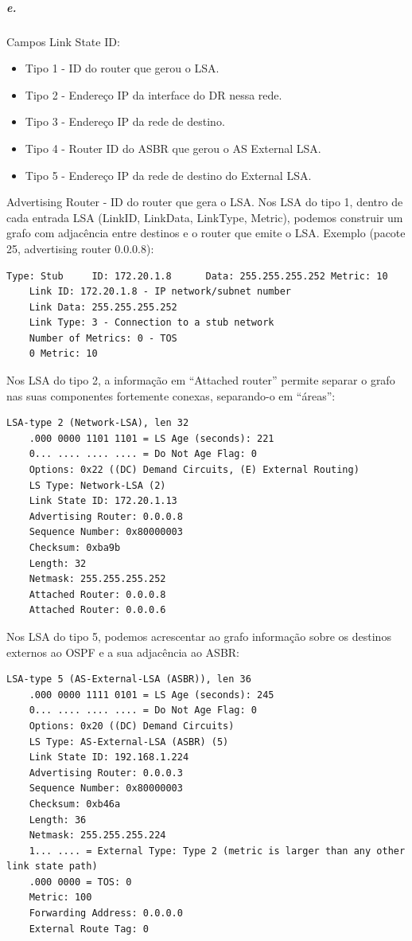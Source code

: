 \subparagraph{e.} Campos Link State ID:
\begin{itemize}
\item Tipo 1 - ID do router que gerou o LSA.
\item Tipo 2 - Endereço IP da interface do DR nessa rede.
\item Tipo 3 - Endereço IP da rede de destino.
\item Tipo 4 - Router ID do ASBR que gerou o AS External LSA.
\item Tipo 5 - Endereço IP da rede de destino do External LSA.
\end{itemize}
Advertising Router - ID do router que gera o LSA.
Nos LSA do tipo 1, dentro de cada entrada LSA (LinkID, LinkData,
LinkType, Metric), podemos construir um grafo com adjacência entre
destinos e o router que emite o LSA. Exemplo (pacote 25, advertising
router 0.0.0.8):
\begin{verbatim}
Type: Stub     ID: 172.20.1.8      Data: 255.255.255.252 Metric: 10
    Link ID: 172.20.1.8 - IP network/subnet number
    Link Data: 255.255.255.252
    Link Type: 3 - Connection to a stub network
    Number of Metrics: 0 - TOS
    0 Metric: 10
\end{verbatim}
Nos LSA do tipo 2, a informação em ``Attached router'' permite separar
o grafo nas suas componentes fortemente conexas, separando-o em
``áreas'':
\begin{verbatim}
LSA-type 2 (Network-LSA), len 32
    .000 0000 1101 1101 = LS Age (seconds): 221
    0... .... .... .... = Do Not Age Flag: 0
    Options: 0x22 ((DC) Demand Circuits, (E) External Routing)
    LS Type: Network-LSA (2)
    Link State ID: 172.20.1.13
    Advertising Router: 0.0.0.8
    Sequence Number: 0x80000003
    Checksum: 0xba9b
    Length: 32
    Netmask: 255.255.255.252
    Attached Router: 0.0.0.8
    Attached Router: 0.0.0.6
\end{verbatim}
Nos LSA do tipo 5, podemos acrescentar ao grafo informação sobre os
destinos externos ao OSPF e a sua adjacência ao ASBR:
\begin{verbatim}
LSA-type 5 (AS-External-LSA (ASBR)), len 36
    .000 0000 1111 0101 = LS Age (seconds): 245
    0... .... .... .... = Do Not Age Flag: 0
    Options: 0x20 ((DC) Demand Circuits)
    LS Type: AS-External-LSA (ASBR) (5)
    Link State ID: 192.168.1.224
    Advertising Router: 0.0.0.3
    Sequence Number: 0x80000003
    Checksum: 0xb46a
    Length: 36
    Netmask: 255.255.255.224
    1... .... = External Type: Type 2 (metric is larger than any other link state path)
    .000 0000 = TOS: 0
    Metric: 100
    Forwarding Address: 0.0.0.0
    External Route Tag: 0
\end{verbatim}

